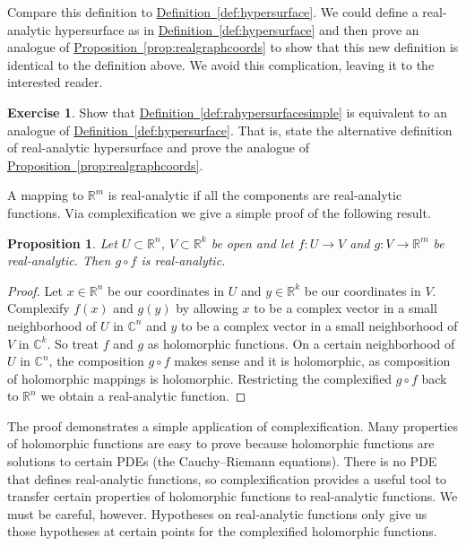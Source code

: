 \documentclass[12pt,openany]{book}
\newcommand{\C}{{\mathbb{C}}}
\newcommand{\R}{{\mathbb{R}}}
\theoremstyle{plain}
\newtheorem{prop}[thm]{Proposition}
\theoremstyle{remark}
\theoremstyle{definition}
\newenvironment{exbox}{%
    \def\FrameCommand{\vrule width 1pt \relax\hspace{10pt}}%
    \MakeFramed{\advance\hsize-\width\FrameRestore}%
}{%
    \endMakeFramed
}
\theoremstyle{exercise}
\newtheorem{exercise}{Exercise}[section]
\theoremstyle{example}
\newcommand{\propref}[1]{\hyperref[#1]{Proposition~\ref*{#1}}}
\newcommand{\defnref}[1]{\hyperref[#1]{Definition~\ref*{#1}}}
\begin{document}
Compare this definition to \defnref{def:hypersurface}.  We could
define a real-analytic hypersurface as in
\defnref{def:hypersurface} and then prove an analogue of
\propref{prop:realgraphcoords} to show that this new definition
is identical to the definition above.
We avoid this complication, leaving it to the interested reader.

\begin{exbox}
\begin{exercise}
Show that \defnref{def:rahypersurfacesimple}
is equivalent to an analogue of
\defnref{def:hypersurface}.  That is, state the alternative definition of
real-analytic hypersurface and prove the analogue of
\propref{prop:realgraphcoords}.
\end{exercise}
\end{exbox}

A mapping to $\R^m$ is real-analytic if all the components are real-analytic
functions.  Via complexification we give a simple proof of the following
result.

\begin{prop}
Let $U \subset \R^n$, $V \subset \R^k$ be open and let
$f \colon U \to V$ and $g \colon V \to \R^m$ be real-analytic.
Then $g \circ f$ is real-analytic.
\end{prop}

\begin{proof}
Let $x \in \R^n$ be our coordinates in $U$ and $y \in \R^k$ be
our coordinates in $V$.  Complexify $f(x)$ and $g(y)$ by
allowing $x$ to be a complex vector in a small neighborhood of $U$ in
$\C^n$
and $y$ to be a complex vector in a small neighborhood of $V$ in $\C^k$.
So treat $f$ and $g$ as holomorphic functions.  On a certain
neighborhood of $U$ in $\C^n$, the composition $g \circ f$ makes sense
and it is holomorphic, as composition of holomorphic mappings is holomorphic.
Restricting the complexified $g \circ f$ back to $\R^n$ we obtain a
real-analytic function.
\end{proof}

The proof demonstrates a simple application of complexification.  Many
properties of holomorphic functions are easy to prove because
holomorphic functions are solutions to certain PDEs (the Cauchy--Riemann
equations).  There is no PDE
that defines real-analytic functions, so complexification provides a useful
tool to transfer certain properties of holomorphic functions to
real-analytic functions.  We must be careful, however.  Hypotheses on
real-analytic functions only give us those hypotheses at certain points for the
complexified holomorphic functions.
\end{document}
